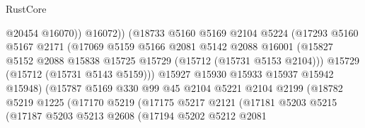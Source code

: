 \begin{lexlean}{RustCore}
\begin{coremodule}
                                    @20454
                                    @16070))
                                @16072))
                            (@18733
                              @5160
                              @5169
                              @2104
                              @5224
                              (@17293
                                @5160
                                @5167
                                @2171
                                (@17069
                                  @5159
                                  @5166
                                  @2081
                                  @5142
                                  @2088
                                  @16001
                                  (@15827
                                    @5152
                                    @2088
                                    @15838
                                    @15725
                                    @15729
                                    (@15712 (@15731 @5153 @2104)))
                                  @15729
                                  (@15712 (@15731 @5143 @5159)))
                                @15927
                                @15930
                                @15933
                                @15937
                                @15942
                                @15948)
                              (@15787
                                @5169
                                @330
                                @99
                                @45
                                @2104
                                @5221
                                @2104
                                @2199
                                (@18782
                                  @5219
                                  @1225
                                  (@17170
                                    @5219
                                    (@17175
                                      @5217
                                      @2121
                                      (@17181
                                        @5203
                                        @5215
                                        (@17187
                                          @5203
                                          @5213
                                          @2608
                                          (@17194
                                            @5202
                                            @5212
                                            @2081

\end{coremodule}
\end{lexlean}
